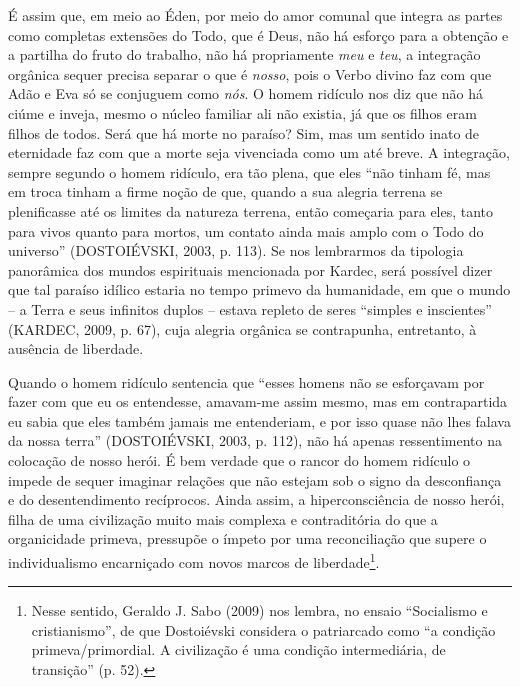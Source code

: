 É assim que, em meio ao Éden, por meio do amor comunal que integra as
partes como completas extensões do Todo, que é Deus, não há esforço para
a obtenção e a partilha do fruto do trabalho, não há propriamente
\emph{meu} e \emph{teu}, a integração orgânica sequer precisa separar o
que é \emph{nosso}, pois o Verbo divino faz com que Adão e Eva só se
conjuguem como \emph{nós}. O homem ridículo nos diz que não há ciúme e
inveja, mesmo o núcleo familiar ali não existia, já que os filhos eram
filhos de todos. Será que há morte no paraíso? Sim, mas um sentido inato
de eternidade faz com que a morte seja vivenciada como um até breve. A
integração, sempre segundo o homem ridículo, era tão plena, que eles
``não tinham fé, mas em troca tinham a firme noção de que, quando a sua
alegria terrena se plenificasse até os limites da natureza terrena,
então começaria para eles, tanto para vivos quanto para mortos, um
contato ainda mais amplo com o Todo do universo'' (DOSTOIÉVSKI, 2003, p.
113). Se nos lembrarmos da tipologia panorâmica dos mundos espirituais
mencionada por Kardec, será possível dizer que tal paraíso idílico
estaria no tempo primevo da humanidade, em que o mundo -- a Terra e seus
infinitos duplos -- estava repleto de seres ``simples e inscientes''
(KARDEC, 2009, p. 67), cuja alegria orgânica se contrapunha, entretanto,
à ausência de liberdade.

Quando o homem ridículo sentencia que ``esses homens não se esforçavam
por fazer com que eu os entendesse, amavam-me assim mesmo, mas em
contrapartida eu sabia que eles também jamais me entenderiam, e por isso
quase não lhes falava da nossa terra'' (DOSTOIÉVSKI, 2003, p. 112), não
há apenas ressentimento na colocação de nosso herói. É bem verdade que o
rancor do homem ridículo o impede de sequer imaginar relações que não
estejam sob o signo da desconfiança e do desentendimento recíprocos.
Ainda assim, a hiperconsciência de nosso herói, filha de uma civilização
muito mais complexa e contraditória do que a organicidade primeva,
pressupõe o ímpeto por uma reconciliação que supere o individualismo
encarniçado com novos marcos de liberdade\footnote{Nesse sentido,
  Geraldo J. Sabo (2009) nos lembra, no ensaio ``Socialismo e
  cristianismo'', de que Dostoiévski considera o patriarcado como ``a
  condição primeva/primordial. A civilização é uma condição
  intermediária, de transição'' (p. 52).}.

